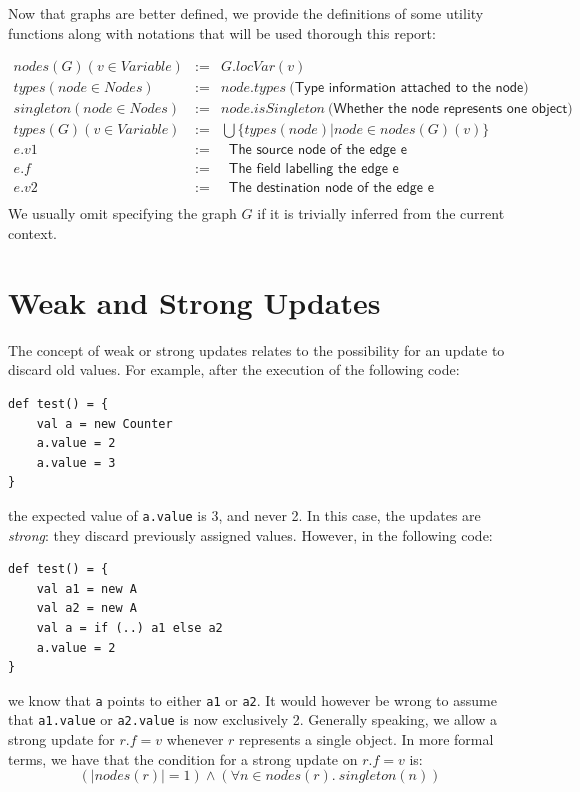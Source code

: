 \FloatBarrier

Now that graphs are better defined, we provide the definitions of some utility
functions along with notations that will be used thorough this report:

\begin{eqnarray*}
    nodes(G)(v \in Variable)  &:=& G.locVar(v) \\
    types(node \in Nodes)     &:=& node.types ~\textsf{(Type information attached to the node)} \\
    singleton(node \in Nodes) &:=& node.isSingleton ~\textsf{(Whether the node represents one object)} \\
    types(G)(v \in Variable)  &:=& \bigcup \{ types(node) | node \in nodes(G)(v) \} \\
    e.v1  &:=& ~\textsf{ The source node of the edge e} \\
    e.f  &:=& ~\textsf{ The field labelling the edge e} \\
    e.v2  &:=& ~\textsf{ The destination node of the edge e} \\
\end{eqnarray*}
We usually omit specifying the graph $G$ if it is trivially inferred from the
current context.


\section{Weak and Strong Updates}
The concept of weak or strong updates relates to the possibility for an update to
discard old values. For example, after the execution of the following code:
\begin{lstlisting}
def test() = {
    val a = new Counter
    a.value = 2
    a.value = 3
}
\end{lstlisting}
the expected value of \verb/a.value/ is 3, and never 2. In this case, the
updates are \emph{strong}: they discard previously assigned values. However, in
the following code:
\begin{lstlisting}
def test() = {
    val a1 = new A
    val a2 = new A
    val a = if (..) a1 else a2
    a.value = 2
}
\end{lstlisting}
we know that \verb/a/ points to either \verb/a1/ or \verb/a2/. It would however
be wrong to assume that \verb/a1.value/ or \verb/a2.value/ is now exclusively
2. Generally speaking, we allow a strong update for $r.f = v$ whenever $r$
represents a single object. In more formal terms, we have that the condition
for a strong update on $r.f = v$ is:
$$
    (|nodes(r)| = 1) \land ( \forall n \in nodes(r).~singleton(n) )
$$

